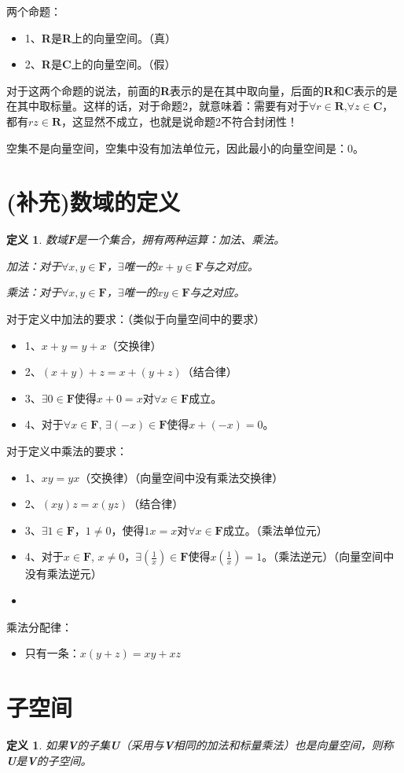 \documentclass[11pt, b5paper, oneside]{book}
\newtheorem{definition}[theorem]{定义}
\begin{document}
两个命题：
\begin{itemize}
    \item 1、\textbf{R}是\textbf{R}上的向量空间。（真）
    \item 2、\textbf{R}是\textbf{C}上的向量空间。（假）
\end{itemize}
    
对于这两个命题的说法，前面的\textbf{R}表示的是在其中取向量，后面的\textbf{R}和\textbf{C}表示的是在其中取标量。这样的话，对于命题2，就意味着：需要有对于$\forall r \in \textbf{R}\text{,}\forall z \in \textbf{C}$，都有$rz \in \textbf{R}$，这显然不成立，也就是说命题2不符合封闭性！

空集不是向量空间，空集中没有加法单位元，因此最小的向量空间是：{0}。
    
\section{(补充)数域的定义}

\begin{definition}
    数域\textbf{F}是一个集合，拥有两种运算：加法、乘法。
    
    加法：对于$\forall x,y\in \textbf{F}$，$\exists$唯一的$x+y\in \textbf{F}$与之对应。

    乘法：对于$\forall x,y\in \textbf{F}$，$\exists$唯一的$xy\in \textbf{F}$与之对应。
\end{definition}

对于定义中加法的要求：（类似于向量空间中的要求）
\begin{itemize}
    \item 1、$x+y=y+x$（交换律）
    \item 2、$(x+y)+z=x+(y+z)$（结合律）
    \item 3、$\exists 0 \in \textbf{F}$使得$x+0=x$对$\forall x \in \textbf{F}$成立。
    \item 4、对于$\forall x \in \textbf{F}$, $\exists(-x) \in \textbf{F}$使得$x+(-x) = 0$。
\end{itemize}

对于定义中乘法的要求：
\begin{itemize}
    \item 1、$xy=yx$（交换律）（向量空间中没有乘法交换律）
    \item 2、$(xy)z=x(yz)$（结合律）
    \item 3、$\exists 1 \in \textbf{F}$，$1 \neq 0$，使得$1x=x$对$\forall x \in \textbf{F}$成立。（乘法单位元）
    \item 4、对于$x \in \textbf{F}$, $x \neq 0$，$\exists(\frac{1}{x}) \in \textbf{F}$使得$x(\frac{1}{x}) = 1$。（乘法逆元）（向量空间中没有乘法逆元）
    \item 
\end{itemize}

乘法分配律：
\begin{itemize}
    \item 只有一条：$x(y+z) = xy+xz$
\end{itemize}

\section{子空间}

\begin{definition}
    如果\textbf{V}的子集\textbf{U}（采用与\textbf{V}相同的加法和标量乘法）也是向量空间，则称\textbf{U}是\textbf{V}的子空间。
\end{definition}
\end{document}
